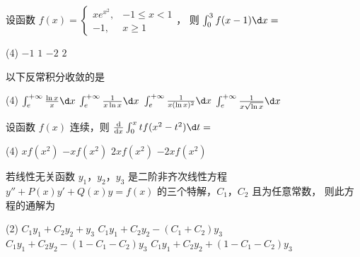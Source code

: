 \documentclass[quiet]{ctexart}
\begin{document}
\begin{problem}
  设函数 $f(x) =
  \begin{cases}
    xe^{x^2}, & -1 \leq x < 1\\
    -1,       & x \geq 1
  \end{cases}$，
  则 $\int_0^3 f(x - 1) \d x =$
  \begin{tasks}(4)
    \task $-1$
    \task $1$
    \task $-2$
    \task $2$
  \end{tasks}
\end{problem}
\begin{solution}
  
\end{solution}

\begin{problem}
  以下反常积分收敛的是
  \begin{tasks}(4)
    \task $\int_e^{+\infty} \frac{\ln x}{x} \d x$
    \task $\int_e^{+\infty} \frac{1}{x \ln x} \d x$
    \task $\int_e^{+\infty} \frac{1}{x (\ln x)^2} \d x$
    \task $\int_e^{+\infty} \frac{1}{x \sqrt{\ln x}} \d x$
  \end{tasks}
\end{problem}
\begin{solution}
  
\end{solution}

\begin{problem}
  设函数 $f(x)$ 连续，则 $\odv{}x \int_0^x tf(x^2 - t^2) \d t =$
  \begin{tasks}(4)
    \task $xf(x^2)$
    \task $-xf(x^2)$
    \task $2xf(x^2)$
    \task $-2xf(x^2)$
  \end{tasks}
\end{problem}
\begin{solution}
  
\end{solution}

\begin{problem}
  若线性无关函数 $y_1$，$y_2$，$y_3$ 是二阶非齐次线性方程
  $y'' + P(x)y' + Q(x)y = f(x)$ 的三个特解，$C_1$，$C_2$ 且为任意常数，
  则此方程的通解为
  \begin{tasks}(2)
    \task $C_1y_1 + C_2y_2 + y_3$
    \task $C_1y_1 + C_2y_2 - (C_1 + C_2)y_3$
    \task $C_1y_1 + C_2y_2 - (1 - C_1 - C_2)y_3$
    \task $C_1y_1 + C_2y_2 + (1 - C_1 - C_2)y_3$
  \end{tasks}
\end{problem}
\begin{solution}
  
\end{solution}
\end{document}
